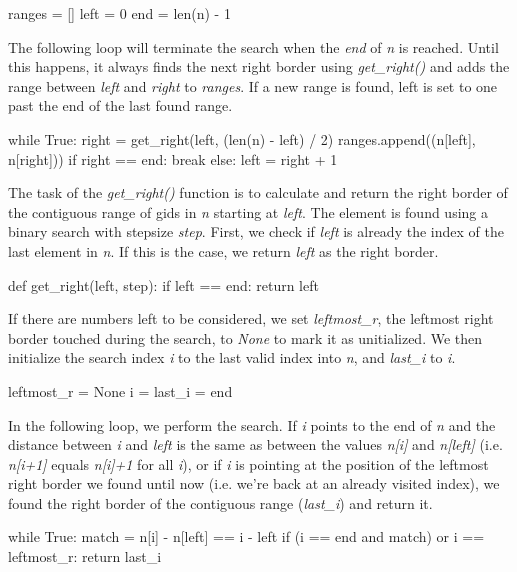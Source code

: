 \documentclass{frontiersSCNS} %
\begin{document}
\begin{pythoncode}
ranges = []
left = 0
end = len(n) - 1
\end{pythoncode}

The following loop will terminate the search when the \emph{end} of
\emph{n} is reached. Until this happens, it always finds the next
right border using \emph{get\_right()} and adds the range between
\emph{left} and \emph{right} to \emph{ranges}. If a new range is
found, left is set to one past the end of the last found range.

\begin{pythoncode}
while True:
    right = get_right(left, (len(n) - left) / 2)
    ranges.append((n[left], n[right]))
    if right == end:
        break
    else:
        left = right + 1
\end{pythoncode}

The task of the \emph{get\_right()} function is to calculate and
return the right border of the contiguous range of gids in \emph{n}
starting at \emph{left}. The element is found using a binary search
with stepsize \emph{step}. First, we check if \emph{left} is already
the index of the last element in \emph{n}. If this is the case, we
return \emph{left} as the right border.

\begin{pythoncode}
def get_right(left, step):
    if left == end:
        return left
\end{pythoncode}

If there are numbers left to be considered, we set \emph{leftmost\_r},
the leftmost right border touched during the search, to \emph{None} to
mark it as unitialized. We then initialize the search index \emph{i}
to the last valid index into \emph{n}, and \emph{last\_i} to \emph{i}.

\begin{pythoncode}
    leftmost_r = None
    i = last_i = end
\end{pythoncode}

In the following loop, we perform the search. If \emph{i} points to
the end of \emph{n} and the distance between \emph{i} and \emph{left}
is the same as between the values \emph{n[i]} and \emph{n[left]}
(i.e. \emph{n[i+1]} equals \emph{n[i]+1} for all \emph{i}), or if
\emph{i} is pointing at the position of the leftmost right border we
found until now (i.e. we're back at an already visited index), we
found the right border of the contiguous range (\emph{last\_i}) and
return it.

\begin{pythoncode}
    while True:
        match = n[i] - n[left] == i - left
        if (i == end and match) or i == leftmost_r:
            return last_i
\end{pythoncode}
\end{document}

